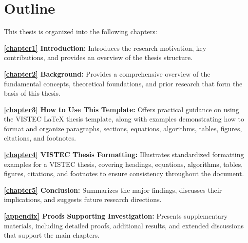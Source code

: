 \section{Outline}
\label{ch1:sec:outline}
\begin{paragraph}
This thesis is organized into the following chapters:

\textbf{\autoref{chapter1} Introduction:}  
Introduces the research motivation, key contributions, and provides an overview of the thesis structure.

\textbf{\autoref{chapter2} Background:}  
Provides a comprehensive overview of the fundamental concepts, theoretical foundations, and prior research that form the basis of this thesis.

\textbf{\autoref{chapter3} How to Use This Template:}  
Offers practical guidance on using the VISTEC {\LaTeX} thesis template, along with examples demonstrating how to format and organize paragraphs, sections, equations, algorithms, tables, figures, citations, and footnotes.

\textbf{\autoref{chapter4} VISTEC Thesis Formatting:}  
Illustrates standardized formatting examples for a VISTEC thesis, covering headings, equations, algorithms, tables, figures, citations, and footnotes to ensure consistency throughout the document.

\textbf{\autoref{chapter5} Conclusion:}  
Summarizes the major findings, discusses their implications, and suggests future research directions.

\textbf{\autoref{appendix} Proofs Supporting Investigation:}  
Presents supplementary materials, including detailed proofs, additional results, and extended discussions that support the main chapters.
\end{paragraph}